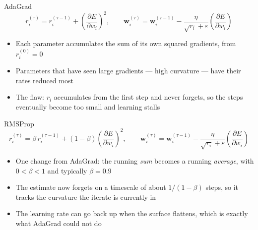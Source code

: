 \documentclass[10pt,aspectratio=169]{beamer}
\begin{document}
\begin{frame}{AdaGrad}
  \vspace{-0.3em}
  \[
    r^{(\tau)}_i = r^{(\tau-1)}_i
      + \left(\frac{\partial E}{\partial w_i}\right)^{2} ,
    \qquad
    \mathbf{w}^{(\tau)}_i = \mathbf{w}^{(\tau-1)}_i
      - \frac{\eta}{\sqrt{r_i} + \varepsilon}
        \left(\frac{\partial E}{\partial w_i}\right)
  \]
  \vspace{-0.6em}
  \begin{itemize}\itemsep0.3em
    \item Each parameter accumulates the sum of its own squared
          gradients, from $r^{(0)}_i = 0$
    \item Parameters that have seen large gradients --- high curvature
          --- have their rates reduced most
    \item \alert{The flaw}: $r_i$ accumulates from the first step and
          never forgets, so the steps eventually become too small and
          learning stalls
  \end{itemize}
\end{frame}

\begin{frame}{RMSProp}
  \vspace{-0.3em}
  \[
    r^{(\tau)}_i = \beta\, r^{(\tau-1)}_i
      + (1-\beta)\left(\frac{\partial E}{\partial w_i}\right)^{2} ,
    \qquad
    \mathbf{w}^{(\tau)}_i = \mathbf{w}^{(\tau-1)}_i
      - \frac{\eta}{\sqrt{r_i} + \varepsilon}
        \left(\frac{\partial E}{\partial w_i}\right)
  \]
  \vspace{-0.5em}
  \begin{itemize}\itemsep0.4em
    \item One change from AdaGrad: the running \emph{sum} becomes a
          running \emph{average}, with $0 < \beta < 1$ and typically
          $\beta = 0.9$
    \item The estimate now forgets on a timescale of about
          $1/(1-\beta)$ steps, so it tracks the curvature the iterate is
          currently in
    \item The learning rate can go back up when the surface flattens,
          which is exactly what AdaGrad could not do
  \end{itemize}
\end{frame}
\end{document}
